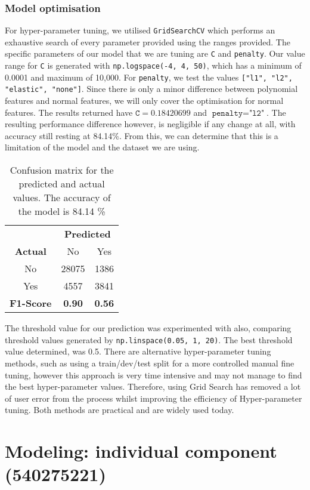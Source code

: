 \documentclass[10pt]{article}
\begin{document}
\subsubsection{Model optimisation}
For hyper-parameter tuning, we utilised \texttt{GridSearchCV} which performs an exhaustive search of every parameter provided using the ranges provided. The specific parameters of our model that we are tuning are \texttt{C} and \texttt{penalty}. Our value range for \texttt{C} is generated with \texttt{np.logspace(-4, 4, 50)}, which has a minimum of 0.0001 and maximum of 10,000. For \texttt{penalty}, we test the values \texttt{["l1", "l2", "elastic", "none"]}. Since there is only a minor difference between polynomial features and normal features, we will only cover the optimisation for normal features. The results returned have \(\texttt{C} = 0.18420699\) and \(\texttt{penalty} = \texttt{"l2"}\). The resulting performance difference however, is negligible if any change at all, with accuracy still resting at 84.14\%. From this, we can determine that this is a limitation of the model and the dataset we are using.
\begin{table}[h]
    \centering
    \begin{tabular}{ccc} 
  &\multicolumn{2}{c}{\textbf{Predicted}}\\ 
          \textbf{Actual}&  No& Yes  \\ 
          No&  28075& 1386\\ 
          Yes&  4557& 3841\\
 \textbf{F1-Score}& \textbf{0.90}&\textbf{0.56}\\ 
    \end{tabular}
    \caption{Confusion matrix for the predicted and actual values. The accuracy of the model is 84.14 \%}
    \label{tab:confusion_matrix_lreg_hyper}
\end{table}
The threshold value for our prediction was experimented with also, comparing threshold values generated by \texttt{np.linspace(0.05, 1, 20)}. The best threshold value determined, was 0.5. There are alternative hyper-parameter tuning methods, such as using a train/dev/test split for a more controlled manual fine tuning, however this approach is very time intensive and may not manage to find the best hyper-parameter values. Therefore, using Grid Search has removed a lot of user error from the process whilst improving the efficiency of Hyper-parameter tuning. Both methods are practical and are widely used today.

\pagebreak
\section{Modeling: individual component (540275221)}
\end{document}

